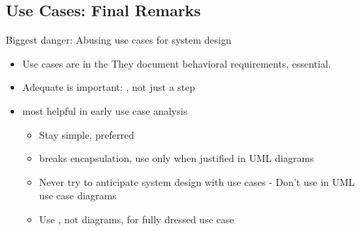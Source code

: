 \subsection{Use Cases: Final Remarks}
\begin{defBox}
    Biggest danger: Abusing use cases for system design
\end{defBox}
\begin{itemize}
    \item Use cases are in the  They document behavioral requirements,  essential.
    \item Adequate  is important: , not just a step
    \item {} most helpful in early use case analysis
    \begin{itemize}
        \item Stay simple,  preferred
        \item {} breaks encapsulation, use only when justified in UML diagrams 
        \item Never try to anticipate system design with use cases - Don't use  in UML use case diagrams
        \item Use , not diagrams, for fully dressed use case
    \end{itemize}
\end{itemize}